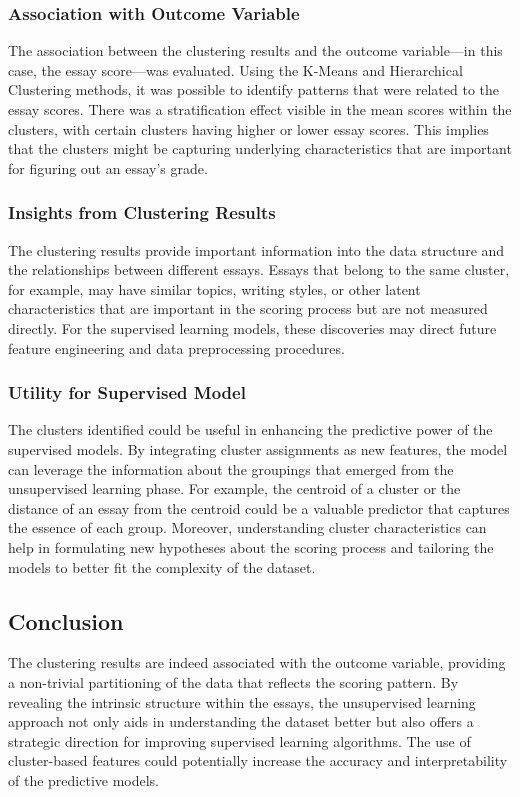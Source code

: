\documentclass[8pt]{report}
\begin{document}
\subsubsection{Association with Outcome Variable}
The association between the clustering results and the outcome variable—in this case, the essay score—was evaluated. Using the K-Means and Hierarchical Clustering methods, it was possible to identify patterns that were related to the essay scores. There was a stratification effect visible in the mean scores within the clusters, with certain clusters having higher or lower essay scores. This implies that the clusters might be capturing underlying characteristics that are important for figuring out an essay's grade.

\subsubsection{Insights from Clustering Results}
The clustering results provide important information into the data structure and the relationships between different essays. Essays that belong to the same cluster, for example, may have similar topics, writing styles, or other latent characteristics that are important in the scoring process but are not measured directly. For the supervised learning models, these discoveries may direct future feature engineering and data preprocessing procedures.

\subsubsection{Utility for Supervised Model}
The clusters identified could be useful in enhancing the predictive power of the supervised models. By integrating cluster assignments as new features, the model can leverage the information about the groupings that emerged from the unsupervised learning phase. For example, the centroid of a cluster or the distance of an essay from the centroid could be a valuable predictor that captures the essence of each group. Moreover, understanding cluster characteristics can help in formulating new hypotheses about the scoring process and tailoring the models to better fit the complexity of the dataset.

\subsection{Conclusion}
The clustering results are indeed associated with the outcome variable, providing a non-trivial partitioning of the data that reflects the scoring pattern. By revealing the intrinsic structure within the essays, the unsupervised learning approach not only aids in understanding the dataset better but also offers a strategic direction for improving supervised learning algorithms. The use of cluster-based features could potentially increase the accuracy and interpretability of the predictive models.
\end{document}

